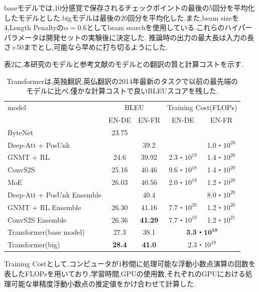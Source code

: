 \documentclass{jarticle}     %
\begin{document}
baseモデルでは,10分感覚で保存されるチェックポイントの最後の5回分を平均化したモデルとした.bigモデルは最後の20回分を平均化した.また,beam sizeを4,Length Penaltyの$\alpha=0.6$としてbeam searchを使用している.これらのハイパーパラメータは開発セットの実験後に決定した.
推論時の出力の最大長は入力の長さ+50までとし,可能なら早めに打ち切るようにした.
\par
表2に,本研究のモデルと参考文献のモデルとの翻訳の質と計算コストを示す.

\begin{table}[h]
  \caption{Transformerは,英独翻訳,英仏翻訳の2014年最新のタスクで以前の最先端のモデルに比べ,僅かな計算コストで良いBLEUスコアを残した.}
  \label{table:Transformer}
  \centering
   \begin{tabular}{lcccc}
    \toprule             %
    model & \multicolumn{2}{c}{BLEU} & \multicolumn{2}{l}{Training Cost(FLOPs)}\\
    \cmidrule(lr){2-3}
    \cmidrule(lr){4-5}
     & EN-DE & EN-FR & EN-DE & EN-FR \\
    \midrule             %
    ByteNet & 23.75 & & & \\
    Deep-Att + PosUnk & & 39.2 & & 1.0・$10^{20}$ \\
    GNMT + RL & 24.6 & 39.92 & 2.3・$10^{19}$ & 1.4・$10^{20}$ \\
    ConvS2S & 25.16 & 40.46 & 9.6・$10^{18}$ & 1.4・$10^{20}$ \\
    MoE & 26.03 & 40.56 & 2.0・$10^{19}$ & 1.2・$10^{20}$ \\
    \hline
    Deep-Att + PosUnk Ensemble & & 40.4 & & 8.0・$10^{20}$ \\
    GNMT + RL Ensemble & 26.30 & 41.16 & 7.7・$10^{20}$ & 1.2・$10^{20}$ \\
    ConvS2S Ensemble & 26.36 & \textbf{41.29} & 7.7・$10^{19}$ & 1.2・$10^{21}$ \\
    \hline
    Transformer(base model) & 27.3 & 38.1 & \multicolumn{2}{c}{\bf{3.3・$\mathbf{10^{18}}$}} \\
    Transformer(big) & \textbf{28.4} & \textbf{41.0} &  \multicolumn{2}{c}{2.3・$10^{19}$}\\ 
    \bottomrule          %
   \end{tabular}
 \end{table}

Training Costとして,コンピュータが1秒間に処理可能な浮動小数点演算の回数を表したFLOPsを用いており,学習時間,GPUの使用数,それぞれのGPUにおける処理可能な単精度浮動小数点の推定値をかけ合わせて計算した.
\end{document}
